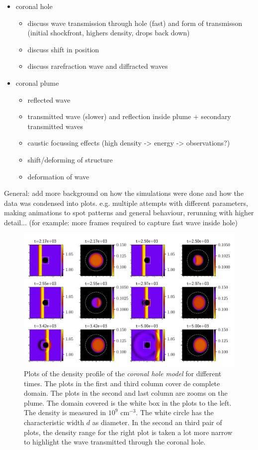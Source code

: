 \begin{itemize}
	\item coronal hole
		\begin{itemize}
	\item discuss wave transmission through hole (fast) and form of transmisson (initial shockfront, highers density, drops back down)
	\item discuss shift in position
	\item discuss rarefraction wave and diffracted waves
	\end{itemize}
	\item coronal plume
		\begin{itemize}
			\item reflected wave
			\item transmitted wave (slower) and reflection inside plume + secondary transmitted waves
			\item caustic focussing effects (high density -> energy -> observations?)
			\item shift/deforming of structure
			\item deformation of wave
		\end{itemize}
\end{itemize}
General: add more background on how the simulations were done and how the data was condensed into plots.
e.g. multiple attempts with different parameters, making animations to spot patterns and general behaviour, rerunning with higher detail... (for example: more frames required to capture fast wave inside hole)


\begin{figure}[H]
	\centering
	\includegraphics[width=\linewidth]{images/hole-frames.pdf}
	\caption{Plots of the density profile of the \emph{coronal hole model} for different times. 
	The plots in the first and third column cover de complete domain.
	The plots in the second and last column are zooms on the plume. 
	The domain covered is the white box in the plots to the left.
 The density is measured in $10^{9}$ cm$^{-3}$.
The white circle has the characteristic width $d$ as diameter. 
In the second an third pair of plots, the density range for the right plot is taken a lot more narrow to highlight the wave transmitted through the coronal hole.}
	\label{fig:hole-frames}
\end{figure}

